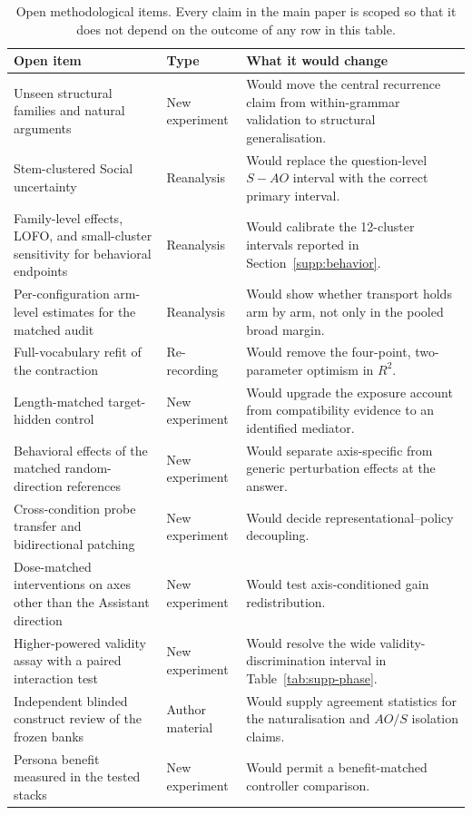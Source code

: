 \documentclass[letterpaper]{article}
\begin{document}
\begin{table}[t]
\centering
\small
\begin{tabularx}{\textwidth}{@{}L{4.3cm}L{2.4cm}Y@{}}
\toprule
Open item & Type & What it would change \\
\midrule
Unseen structural families and natural arguments & New experiment & Would move the central recurrence claim from within-grammar validation to structural generalisation. \\
Stem-clustered Social uncertainty & Reanalysis & Would replace the question-level $S-AO$ interval with the correct primary interval. \\
Family-level effects, LOFO, and small-cluster sensitivity for behavioral endpoints & Reanalysis & Would calibrate the 12-cluster intervals reported in Section~\ref{supp:behavior}. \\
Per-configuration arm-level estimates for the matched audit & Reanalysis & Would show whether transport holds arm by arm, not only in the pooled broad margin. \\
Full-vocabulary refit of the contraction & Re-recording & Would remove the four-point, two-parameter optimism in $R^{2}$. \\
Length-matched target-hidden control & New experiment & Would upgrade the exposure account from compatibility evidence to an identified mediator. \\
Behavioral effects of the matched random-direction references & New experiment & Would separate axis-specific from generic perturbation effects at the answer. \\
Cross-condition probe transfer and bidirectional patching & New experiment & Would decide representational--policy decoupling. \\
Dose-matched interventions on axes other than the Assistant direction & New experiment & Would test axis-conditioned gain redistribution. \\
Higher-powered validity assay with a paired interaction test & New experiment & Would resolve the wide validity-discrimination interval in Table~\ref{tab:supp-phase}. \\
Independent blinded construct review of the frozen banks & Author material & Would supply agreement statistics for the naturalisation and $AO/S$ isolation claims. \\
Persona benefit measured in the tested stacks & New experiment & Would permit a benefit-matched controller comparison. \\
\bottomrule
\end{tabularx}
\caption{Open methodological items. Every claim in the main paper is scoped so that it does not depend on the outcome of any row in this table.}
\label{tab:supp-open}
\end{table}
\end{document}
